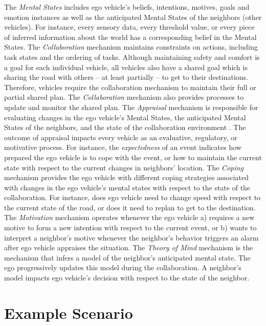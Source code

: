 \documentclass[journal, 11pt]{IEEEtran}
\begin{document}
The \textit{Mental States} includes ego vehicle's beliefs, intentions,
motives, goals and emotion instances as well as the anticipated Mental States of
the neighbors (other vehicles). For instance, every sensory data, every
threshold value, or every piece of inferred information about the world has a
corresponding belief in the Mental States. The \textit{Collaboration} mechanism
maintains constraints on actions, including task states and the ordering of
tasks. Although maintaining safety and comfort is a goal for each individual
vehicle, all vehicles also have a shared goal which is sharing the road with
others -- at least partially -- to get to their destinations. Therefore,
vehicles require the collaboration mechanism to maintain their full or partial
shared plan. The \textit{Collaboration} mechanism also provides processes to
update and monitor the shared plan. The \textit{Appraisal} mechanism is
responsible for evaluating changes in the ego vehicle's Mental States, the
anticipated Mental States of the neighbors, and the state of the collaboration
environment \cite{shayganfar:appraisal-short}. The outcome of appraisal impacts
every vehicle as an evaluative, regulatory, or motivative process. For instance,
the \textit{expectedness} of an event indicates how prepared the ego vehicle is
to cope with the event, or how to maintain the current state with respect to the
current changes in neighbors' location. The \textit{Coping} mechanism provides
the ego vehicle with different coping strategies associated with changes in the
ego vehicle's mental states with respect to the state of the collaboration. For
instance, does ego vehicle need to change speed with respect to the current
state of the road, or does it need to replan to get to the destination. The
\textit{Motivation} mechanism operates whenever the ego vehicle a) requires a
new motive to form a new intention with respect to the current event, or b)
wants to interpret a neighbor's motive whenever the neighbor's behavior triggers
an alarm after ego vehicle appraises the situation. The \textit{Theory of Mind}
mechanism is the mechanism that infers a model of the neighbor's anticipated
mental state. The ego progressively updates this model during the collaboration.
A neighbor's model impacts ego vehicle's decision with respect to the state of
the neighbor.

\section{Example Scenario}
\label{sec:example-scenario}
\end{document}
